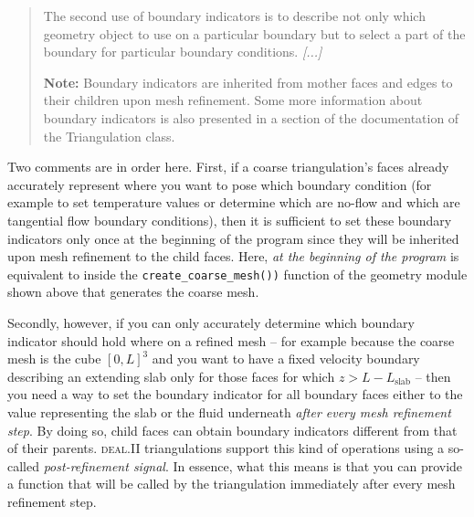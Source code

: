 \documentclass{article}
\newcommand{\dealii}{{\textsc{deal.II}}}
\begin{document}
\begin{quote}
  The second use of boundary indicators is to describe not only which geometry
  object to use on a particular boundary but to select a part of the boundary
  for particular boundary conditions. \textit{[...]}

  \textbf{Note:} Boundary indicators are inherited from mother faces and edges to
  their children upon mesh refinement. Some more information about boundary
  indicators is also presented in a section of the documentation of the
  Triangulation class.
\end{quote}

Two comments are in order here. First, if a coarse triangulation's faces
already accurately represent where you want to pose which boundary condition
(for example to set temperature values or determine which are no-flow and
which are tangential flow boundary conditions), then it is sufficient to set
these boundary indicators only once at the beginning of the program since they
will be inherited upon mesh refinement to the child faces. Here, \textit{at the
beginning of the program} is equivalent to inside the
\texttt{create\_coarse\_mesh())} function of the geometry module shown above
that generates the coarse mesh.

Secondly, however, if you can only accurately determine which boundary
indicator should hold where on a refined mesh -- for example because the
coarse mesh is the cube $[0,L]^3$ and you want to have a fixed velocity
boundary describing an extending slab only for those faces for which
$z>L-L_{\text{slab}}$ -- then you need a way to set the boundary indicator
for all boundary faces either to the value representing the slab or the fluid
underneath \textit{after every mesh refinement step}. By doing so, child faces
can obtain boundary indicators different from that of their parents. \dealii{}
triangulations support this kind of operations using a so-called
\textit{post-refinement signal}. In essence, what this means is that you can
provide a function that will be called by the triangulation immediately after
every mesh refinement step.
\end{document}
